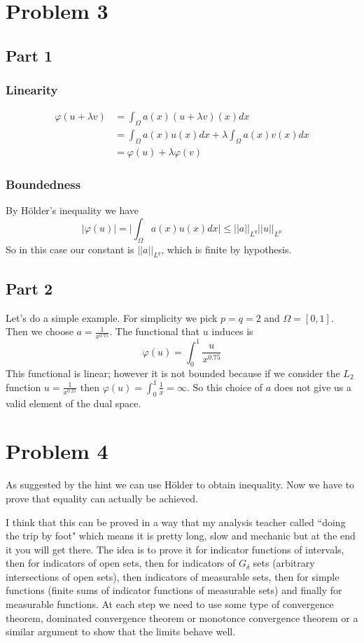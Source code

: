 \documentclass{article}
\begin{document}
\section*{Problem 3}
\subsection*{Part 1}
\subsubsection*{Linearity}
\begin{align*}
	\varphi(u+\lambda v) &= \int_\Omega a(x)(u+\lambda v)(x)dx\\
	         &= \int_\Omega a(x)u(x)dx + \lambda\int_\Omega a(x)v(x)dx\\
		 &= \varphi(u) + \lambda \varphi(v)
\end{align*}
\subsubsection*{Boundedness}
By H\"older's inequality we have
\[
	|\varphi(u)|=\bigg|\int_\Omega a(x)u(x)dx\bigg|\leq ||a||_{L^q}||u||_{L^p}
\]
So in this case our constant is $||a||_{L^q}$, which is finite by hypothesis.
\subsection*{Part 2}
Let's do a simple example. For simplicity we pick $p=q=2$ and $\Omega = [0,1]$.
Then we choose $a=\frac{1}{x^{0.75}}$. The functional that $u$ induces is
\[
	\varphi(u)=\int_0^1 \frac{u}{x^{0.75}}
\]
This functional is linear; however it is not bounded because if we consider the
$L_2$ function $u=\frac{1}{x^{0.25}}$ then $\varphi(u)=\int_0^1
\frac{1}{x}=\infty$. So this choice of $a$ does not give us a valid element of
the dual space.
\section*{Problem 4}
As suggested by the hint we can use H\"older to obtain inequality. Now we have
to prove that equality can actually be achieved.

I think that this can be proved in a way that my analysis teacher called ``doing
the trip by foot" which means it is pretty long, slow and mechanic but at the
end it you will get there. The idea is to prove it for indicator functions of
intervals, then for indicators of open sets, then for indicators of $G_\delta$
sets (arbitrary intersections of open sets), then indicators of measurable
sets, then for simple functions (finite sums of indicator functions of
measurable sets) and finally for measurable functions. At each step we need to
use some type of convergence theorem, dominated convergence theorem or
monotonce convergence theorem or a similar argument to show that the limits
behave well.
\end{document}
